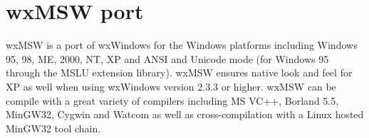\section{wxMSW port}\label{wxmswport}

wxMSW is a port of wxWindows for the Windows platforms
including Windows 95, 98, ME, 2000, NT, XP and ANSI and
Unicode mode (for Windows 95 through the MSLU extension
library). wxMSW ensures native look and feel for XP
as well when using wxWindows version 2.3.3 or higher.
wxMSW can be compile with a great variety of compilers
including MS VC++, Borland 5.5, MinGW32, Cygwin and
Watcom as well as cross-compilation with a Linux hosted
MinGW32 tool chain.

